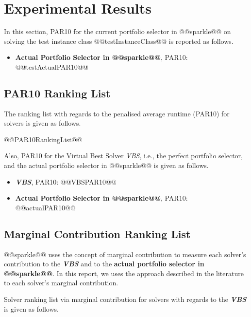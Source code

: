 \documentclass[british]{article}
\begin{document}
\section{Experimental Results}
\label{sec:Experimental_Results}

In this section, PAR10 for the current portfolio selector in @@sparkle@@ on solving the test instance class @@testInstanceClass@@ is reported as follows.

\begin{itemize}
\item \textbf{Actual Portfolio Selector in @@sparkle@@}, PAR10: @@testActualPAR10@@
\end{itemize}


\iffalse
\subsection{PAR10 Ranking List}
\label{sec:PAR10_Ranking}

The ranking list with regards to the penalised average runtime (PAR10) for solvers is given as follows.

\begin{enumerate}
@@PAR10RankingList@@
\end{enumerate}

Also, PAR10 for the Virtual Best Solver \emph{VBS}, i.e., the perfect portfolio selector, and the actual portfolio selector in @@sparkle@@ is given as follows.

\begin{itemize}
\item \textbf{\emph{VBS}}, PAR10: @@VBSPAR10@@
\item \textbf{Actual Portfolio Selector in @@sparkle@@}, PAR10: @@actualPAR10@@
\end{itemize}

\subsection{Marginal Contribution Ranking List}
\label{sec:Marginal_Contribution_Ranking}

@@sparkle@@ uses the concept of marginal contribution \cite{XuEtAl12} to measure each solver's contribution to the \textbf{\emph{VBS}} and to the \textbf{actual portfolio selector in @@sparkle@@}. In this report, we uses the approach described in the literature \cite{FreEtAl16} to each solver's marginal contribution.

Solver ranking list via marginal contribution \cite{XuEtAl12} for solvers with regards to the \textbf{{\em VBS}} is given as follows.
\end{document}
